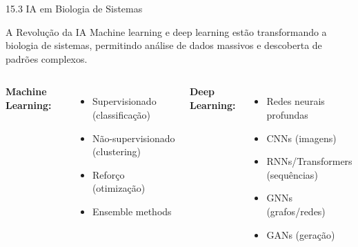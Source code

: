 \begin{frame}{15.3 IA em Biologia de Sistemas}
\begin{block}{A Revolução da IA}
Machine learning e deep learning estão transformando a biologia de sistemas, permitindo análise de dados massivos e descoberta de padrões complexos.
\end{block}

\begin{columns}
\textbf{Machine Learning:}
\begin{itemize}
    \item Supervisionado (classificação)
    \item Não-supervisionado (clustering)
    \item Reforço (otimização)
    \item Ensemble methods
\end{itemize}

\textbf{Deep Learning:}
\begin{itemize}
    \item Redes neurais profundas
    \item CNNs (imagens)
    \item RNNs/Transformers (sequências)
    \item GNNs (grafos/redes)
    \item GANs (geração)
\end{itemize}
\end{columns}

\vspace{0.3cm}

\end{frame}

